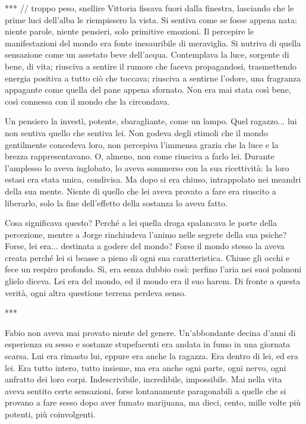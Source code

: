 ***
// troppo peso, snellire
Vittoria fissava fuori dalla finestra, lasciando che le prime luci dell'alba le riempissero la vista. Si sentiva come se fosse appena nata: niente parole, niente pensieri, solo primitive emozioni. Il percepire le manifestazioni del mondo era fonte inesauribile di meraviglia. Si nutriva di quella sensazione come un assetato beve dell'acqua. Contemplava la luce, sorgente di bene, di vita; riusciva a sentire il rumore che faceva propagandosi, trasmettendo energia positiva a tutto ciò che toccava; riusciva a sentirne l'odore, una fragranza appagante come quella del pane appena sfornato. Non era mai stata così bene, così connessa con il mondo che la circondava.

Un pensiero la investì, potente, sbaragliante, come un lampo. Quel ragazzo... lui non sentiva quello che sentiva lei. Non godeva degli stimoli che il mondo gentilmente concedeva loro, non percepiva l'immensa grazia che la luce e la brezza rappresentavano. O, almeno, non come riusciva a farlo lei. Durante l'amplesso lo aveva inglobato, lo aveva sommerso con la sua ricettività: la loro estasi era stata unica, condivisa. Ma dopo si era chiuso, intrappolato nei meandri della sua mente. Niente di quello che lei aveva provato a fare era riuscito a liberarlo, solo la fine dell'effetto della sostanza lo aveva fatto.

Cosa significava questo? Perché a lei quella droga spalancava le porte della percezione, mentre a Jorge rinchiudeva l'animo nelle segrete della sua psiche? Forse, lei era... destinata a godere del mondo? Forse il mondo stesso la aveva creata perché lei si beasse a pieno di ogni sua caratteristica. Chiuse gli occhi e fece un respiro profondo. Sì, era senza dubbio così: perfino l'aria nei suoi polmoni glielo diceva. Lei era del mondo, ed il mondo era il suo harem. Di fronte a questa verità, ogni altra questione terrena perdeva senso.

***

Fabio non aveva mai provato niente del genere. Un'abbondante decina d'anni di esperienza su sesso e sostanze stupefacenti era andata in fumo in una giornata scarsa. Lui era rimasto lui, eppure era anche la ragazza. Era dentro di lei, ed era lei. Era tutto intero, tutto insieme, ma era anche ogni parte, ogni nervo, ogni anfratto dei loro corpi. Indescrivibile, incredibile, impossibile. Mai nella vita aveva sentito certe sensazioni, forse lontanamente paragonabili a quelle che si provano a fare sesso dopo aver fumato marijuana, ma dieci, cento, mille volte più potenti, più coinvolgenti.

